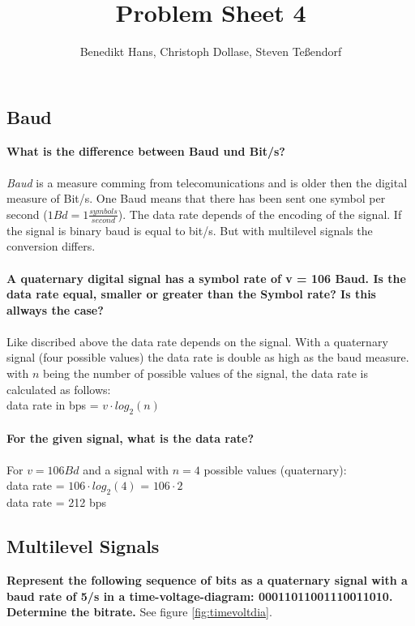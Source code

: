 \documentclass[a4paper,12pt]{article}
\author{Benedikt Hans, Christoph Dollase, Steven Te\ss endorf}
\title{ \textbf{Problem Sheet 4}} %
\begin{document}
	 
	\maketitle	 %
	
\subsection{Baud}
\textbf{What is the difference between Baud und Bit/s?}\\
\\
\textit{Baud} is a measure comming from telecomunications and is older then the digital measure of Bit/s.
One Baud means that there has been sent one symbol per second ($1Bd = 1\frac{symbols}{second}$). The data rate depends of the encoding of the signal. If the signal is binary baud is equal to bit/s. But with multilevel signals the conversion differs.\\
\\
\textbf{A quaternary digital signal has a symbol rate of v = 106 Baud. Is the data rate equal,	smaller or greater than the Symbol rate? Is this allways the case?}\\
\\
Like discribed above the data rate depends on the signal. With a quaternary signal (four possible values) the data rate is double as high as the baud measure. \\
with $n$ being the number of possible values of the signal, the data rate is calculated as follows: \\
data rate in bps = $v \cdot log_{2}(n)$ \\
\\ 
\textbf{For the given signal, what is the data rate?}\\
\\
For $v = 106 Bd$ and a signal with $n=4$ possible values (quaternary):\\
data rate = $106 \cdot log_{2}(4)$ = $106 \cdot 2$ \\
data rate = 212 bps


\subsection{Multilevel Signals}
\textbf{Represent the following sequence of bits as a quaternary signal with a baud rate of 5/s in a time-voltage-diagram: 00011011001110011010. Determine the bitrate.} See figure \ref{fig:timevoltdia}.
\end{document}
